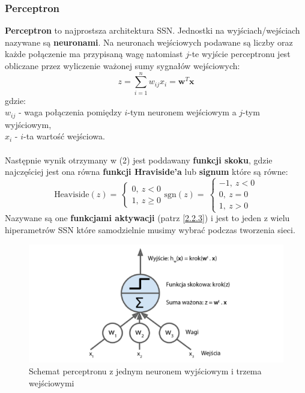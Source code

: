 \documentclass{article}
\renewcommand{\vec}[1]{\mathbf{#1}}
\begin{document}
\subsubsection{Perceptron}
\textbf{Perceptron} to  najprostsza architektura SSN. Jednostki na wyjściach/wejściach
nazywane są \textbf{neuronami}. Na neuronach wejściowych  podawane są liczby oraz
każde połączenie ma przypisaną  wagę natomiast $j$-te wyjście perceptronu jest obliczane przez 
wyliczenie ważonej sumy sygnałów wejściowych:
\begin{equation}
	z = \sum_{i=1}^n w_{ij}x_i = \vec{w}^T\vec{x}
\end{equation}
gdzie:\\
$w_{ij}$ - waga połączenia pomiędzy $i$-tym neuronem wejściowym a $j$-tym wyjściowym,\\
$x_i$ - $i$-ta wartość wejściowa.\\ \\
Następnie wynik otrzymany w (2) jest poddawany \textbf{funkcji skoku}, gdzie najczęściej jest 
ona równa \textbf{funkcji Hraviside'a} lub \textbf{signum} które są równe:
\[
	\text{Heaviside}(z) = \
	\begin{cases}
		0, \: z < 0 \\
		1, \: z \geq 0
	\end{cases} 
	\text{sgn}(z) = \
	\begin{cases}
		-1, \: z < 0 \\
		0, \: z = 0 \\
		1, \: z > 0
	\end{cases} 
\]
Nazywane są one \textbf{funkcjami aktywacji} (patrz [\hyperref[sec:fa]{2.2.3}])
i jest to jeden z wielu hiperametrów SSN które samodzielnie musimy wybrać podczas
tworzenia sieci.\\

\begin{figure}[H]
\centering
\includegraphics[scale=0.5]{perceptron.png}
\caption{Schemat perceptronu z jednym neuronem wyjściowym i trzema wejściowymi \cite{um}}
\end{figure}
\end{document}
